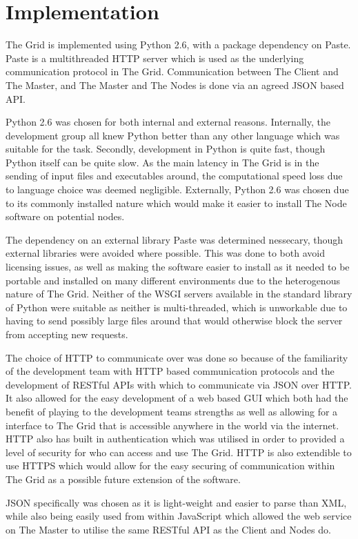 \chapter{Implementation}
The Grid is implemented using Python 2.6, with a package dependency on Paste. Paste is a multithreaded HTTP server which is used as the underlying communication protocol in The Grid. Communication between The Client and The Master, and The Master and The Nodes is done via an agreed JSON based API. 

Python 2.6 was chosen for both internal and external reasons. Internally, the development group all knew Python better than any other language which was suitable for the task. Secondly, development in Python is quite fast, though Python itself can be quite slow. As the main latency in The Grid is in the sending of input files and executables around, the computational speed loss due to language choice was deemed negligible. Externally, Python 2.6 was chosen due to its commonly installed nature which would make it easier to install The Node software on potential nodes. 

The dependency on an external library Paste was determined nessecary, though external libraries were avoided where possible. This was done to both avoid licensing issues, as well as making the software easier to install as it needed to be portable and installed on many different environments due to the heterogenous nature of The Grid. Neither of the WSGI servers available in the standard library of Python were suitable as neither is multi-threaded, which is unworkable due to having to send possibly large files around that would otherwise block the server from accepting new requests.

The choice of HTTP to communicate over was done so because of the familiarity of the development team with HTTP based communication protocols and the development of RESTful APIs with which to communicate via JSON over HTTP. It also allowed for the easy development of a web based GUI which both had the benefit of playing to the development teams strengths as well as allowing for a interface to The Grid that is accessible anywhere in the world via the internet. HTTP also has built in authentication which was utilised in order to provided a level of security for who can access and use The Grid. HTTP is also extendible to use HTTPS which would allow for the easy securing of communication within The Grid as a possible future extension of the software.

JSON specifically was chosen as it is light-weight and easier to parse than XML, while also being easily used from within JavaScript which allowed the web service on The Master to utilise the same RESTful API as the Client and Nodes do. 

